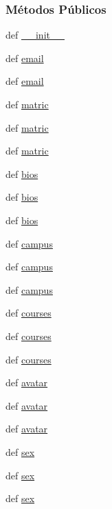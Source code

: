 \subsubsection*{Métodos Públicos}
\begin{DoxyCompactItemize}
\item 
def \hyperlink{classELO_1_1EntityUnit_1_1Professor_a9c5d85cebcb21faceb88528595762d8a}{\-\_\-\-\_\-init\-\_\-\-\_\-}
\item 
def \hyperlink{classELO_1_1EntityUnit_1_1Professor_ab3f1db18ae629280f0476760411e1633}{email}
\item 
def \hyperlink{classELO_1_1EntityUnit_1_1Professor_ab3f1db18ae629280f0476760411e1633}{email}
\item 
def \hyperlink{classELO_1_1EntityUnit_1_1Professor_aeed7183438ff461d33bd0f7a9d179058}{matric}
\item 
def \hyperlink{classELO_1_1EntityUnit_1_1Professor_aeed7183438ff461d33bd0f7a9d179058}{matric}
\item 
def \hyperlink{classELO_1_1EntityUnit_1_1Professor_aeed7183438ff461d33bd0f7a9d179058}{matric}
\item 
def \hyperlink{classELO_1_1EntityUnit_1_1Professor_a2972bd0f21f4ff0ebfb1cada717386ac}{bios}
\item 
def \hyperlink{classELO_1_1EntityUnit_1_1Professor_a2972bd0f21f4ff0ebfb1cada717386ac}{bios}
\item 
def \hyperlink{classELO_1_1EntityUnit_1_1Professor_a2972bd0f21f4ff0ebfb1cada717386ac}{bios}
\item 
def \hyperlink{classELO_1_1EntityUnit_1_1Professor_a561d5ad5396226805832c6e4cef1bd10}{campus}
\item 
def \hyperlink{classELO_1_1EntityUnit_1_1Professor_a561d5ad5396226805832c6e4cef1bd10}{campus}
\item 
def \hyperlink{classELO_1_1EntityUnit_1_1Professor_a561d5ad5396226805832c6e4cef1bd10}{campus}
\item 
def \hyperlink{classELO_1_1EntityUnit_1_1Professor_adad835563fb2eba52ed5015abaf8808f}{courses}
\item 
def \hyperlink{classELO_1_1EntityUnit_1_1Professor_adad835563fb2eba52ed5015abaf8808f}{courses}
\item 
def \hyperlink{classELO_1_1EntityUnit_1_1Professor_adad835563fb2eba52ed5015abaf8808f}{courses}
\item 
def \hyperlink{classELO_1_1EntityUnit_1_1Professor_a158f4ccf788610ba580639216b621c5b}{avatar}
\item 
def \hyperlink{classELO_1_1EntityUnit_1_1Professor_a158f4ccf788610ba580639216b621c5b}{avatar}
\item 
def \hyperlink{classELO_1_1EntityUnit_1_1Professor_a158f4ccf788610ba580639216b621c5b}{avatar}
\item 
def \hyperlink{classELO_1_1EntityUnit_1_1Professor_a2244fa9a5f02a5845cc6c0686b2cf08a}{sex}
\item 
def \hyperlink{classELO_1_1EntityUnit_1_1Professor_a2244fa9a5f02a5845cc6c0686b2cf08a}{sex}
\item 
def \hyperlink{classELO_1_1EntityUnit_1_1Professor_a2244fa9a5f02a5845cc6c0686b2cf08a}{sex}
\end{DoxyCompactItemize}
